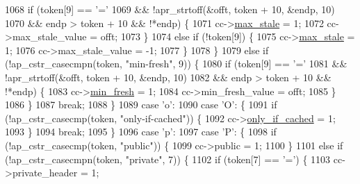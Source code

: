 \begin{DoxyCode}
1068                     \textcolor{keywordflow}{if} (token[9] == \textcolor{charliteral}{'='}
1069                             && !apr\_strtoff(&offt, token + 10, &endp, 10)
1070                             && endp > token + 10 && !*endp) \{
1071                         cc->\hyperlink{structcache__control_a86c0c3648dd91f6793e6150fc2fd2391}{max\_stale} = 1;
1072                         cc->max\_stale\_value = offt;
1073                     \}
1074                     \textcolor{keywordflow}{else} \textcolor{keywordflow}{if} (!token[9]) \{
1075                         cc->\hyperlink{structcache__control_a86c0c3648dd91f6793e6150fc2fd2391}{max\_stale} = 1;
1076                         cc->max\_stale\_value = -1;
1077                     \}
1078                 \}
1079                 \textcolor{keywordflow}{else} \textcolor{keywordflow}{if} (!ap\_cstr\_casecmpn(token, \textcolor{stringliteral}{"min-fresh"}, 9)) \{
1080                     \textcolor{keywordflow}{if} (token[9] == \textcolor{charliteral}{'='}
1081                             && !apr\_strtoff(&offt, token + 10, &endp, 10)
1082                             && endp > token + 10 && !*endp) \{
1083                         cc->\hyperlink{structcache__control_aa2e69b28766eef731031b7b2d728273d}{min\_fresh} = 1;
1084                         cc->min\_fresh\_value = offt;
1085                     \}
1086                 \}
1087                 \textcolor{keywordflow}{break};
1088             \}
1089             \textcolor{keywordflow}{case} \textcolor{charliteral}{'o'}:
1090             \textcolor{keywordflow}{case} \textcolor{charliteral}{'O'}: \{
1091                 \textcolor{keywordflow}{if} (!ap\_cstr\_casecmp(token, \textcolor{stringliteral}{"only-if-cached"})) \{
1092                     cc->\hyperlink{structcache__control_aeca404f2dd16548ae4fbde3592602764}{only\_if\_cached} = 1;
1093                 \}
1094                 \textcolor{keywordflow}{break};
1095             \}
1096             \textcolor{keywordflow}{case} \textcolor{charliteral}{'p'}:
1097             \textcolor{keywordflow}{case} \textcolor{charliteral}{'P'}: \{
1098                 \textcolor{keywordflow}{if} (!ap\_cstr\_casecmp(token, \textcolor{stringliteral}{"public"})) \{
1099                     cc->public = 1;
1100                 \}
1101                 \textcolor{keywordflow}{else} \textcolor{keywordflow}{if} (!ap\_cstr\_casecmpn(token, \textcolor{stringliteral}{"private"}, 7)) \{
1102                     \textcolor{keywordflow}{if} (token[7] == \textcolor{charliteral}{'='}) \{
1103                         cc->private\_header = 1;

\end{DoxyCode}

